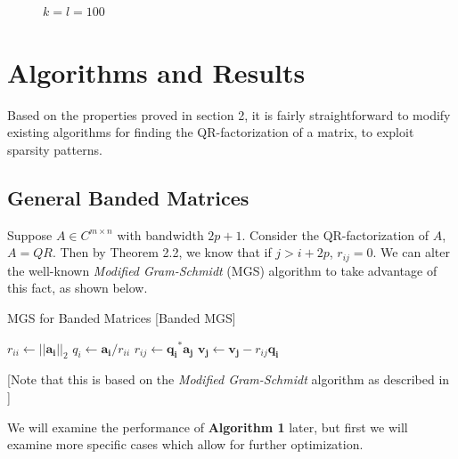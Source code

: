 \documentclass{article}
\numberwithin{pic}{section}
\numberwithin{lem}{section}
\numberwithin{thm}{section}
\numberwithin{cor}{section}
\theoremstyle{definition}
\numberwithin{ex}{section}
\numberwithin{defn}{section}
\theoremstyle{definition}
\theoremstyle{remark}
\newcommand{\set}[1]{\ensuremath{\left\{ #1\right\}}} %
\newcommand{\norm}[1]{\ensuremath{\left | \left | #1 \right | \right |}}
\newlength\tindent
\renewcommand{\indent}{\hspace*{\tindent}}
\begin{document}
\begin{figure}[H] 

    \caption{$k=l=100$ }
\end{figure} 
\section{Algorithms and Results}
\indent Based on the properties proved in section 2, it is fairly straightforward
to modify existing algorithms for finding the QR-factorization of a matrix, to
exploit sparsity patterns.
\subsection{General Banded Matrices}
\indent Suppose $A\in C^{m\times n}$ with bandwidth $2p +1$. Consider the QR-factorization
of $A$, $A = QR$. Then by Theorem 2.2, we
know that if $j > i + 2p$, $r_{ij} = 0$. We can alter the well-known
\textit{Modified Gram-Schmidt} (MGS) algorithm to take advantage of this fact,
as shown below.
\begin{algorithm}[H]
  \caption{MGS for Banded Matrices [Banded MGS]}
  \begin{algorithmic}[1]
    \State$r_{ii}\gets \norm{\mathbf{a_i}}_2$
    \State$q_i\gets \mathbf{a_i} / r_{ii}$
    \For{$j = i + 1$\textbf{ to }$\text{min}\set{i + 2p, n}$}
    \State$r_{ij}\gets \mathbf{q_i}^*\mathbf{a_j}$
    \State$\mathbf{v_j}\gets\mathbf{v_j} - r_{ij}\mathbf{q_i}$
    \EndFor
    \EndFor
  \end{algorithmic}
  [Note that this is based on the \textit{Modified
    Gram-Schmidt} algorithm as described in \cite{nla}] 
\end{algorithm}
\indent We will examine the performance of \textbf{Algorithm 1} later, but first we will
examine more specific cases which allow for further optimization.
\end{document}
